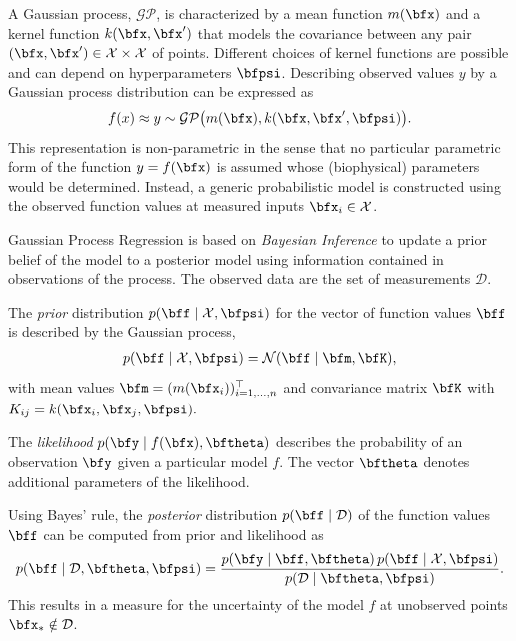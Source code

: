 A Gaussian process, $\mathcal{GP}$, is characterized by a mean function $m(\bfx)$ and a kernel function $k(\bfx,\bfx')$ that models the covariance between any pair $(\bfx, \bfx') \in \mathcal{X} \times \mathcal{X}$ of points. Different choices of kernel functions are possible and can depend on hyperparameters $\bfpsi$. Describing observed values $y$ by a Gaussian process distribution can be expressed as
\begin{equation*}
  \begin{array}{lll}
    f(x) \approx y \sim \mathcal{GP}\big(m(\bfx), k(\bfx,\bfx',\bfpsi)\big).
  \end{array}
\end{equation*}
This representation is non-parametric in the sense that no particular parametric form of the function $y=f(\bfx)$ is assumed whose (biophysical) parameters would be determined. Instead, a generic probabilistic model is constructed using the observed function values at measured inputs $\bfx_i \in \mathcal{X}$.

Gaussian Process Regression is based on \emph{Bayesian Inference} to update a prior belief of the model to a posterior model using information contained in observations of the process.
The observed data are the set of measurements $\mathcal{D}$. 

The \emph{prior} distribution $p(\bff\mid\mathcal{X},\bfpsi)$ for the vector of function values $\bff$ is described by the Gaussian process,
\begin{equation*}
  \begin{array}{lll}
    p(\bff\mid\mathcal{X},\bfpsi) = \mathcal{N}(\bff\mid\bfm,\bfK),
  \end{array}
\end{equation*}
with mean values $\bfm = (m(\bfx_i))^\top_{i=1,\dots,n}$ and convariance matrix $\bfK$ with $K_{ij} = k(\bfx_i,\bfx_j,\bfpsi).$

The \emph{likelihood} $p(\bfy\mid f(\bfx), \bftheta)$ describes the probability of an observation $\bfy$ given a particular model $f$. The vector $\bftheta$ denotes additional parameters of the likelihood. 

Using Bayes' rule, the \emph{posterior} distribution $p(\bff\mid\mathcal{D})$ of the function values $\bff$ can be computed from prior and likelihood as
\begin{equation*}
  \begin{array}{lll}
    p(\bff\mid\mathcal{D},\bftheta,\bfpsi) 
      = \dfrac{p(\bfy\mid\bff,\bftheta)\,p(\bff\mid\mathcal{X},\bfpsi)}{p(\mathcal{D}\mid\bftheta,\bfpsi)}.
  \end{array}
\end{equation*}
This results in a measure for the uncertainty of the model $f$ at unobserved points $\bfx_\ast \notin \mathcal{D}$. 

